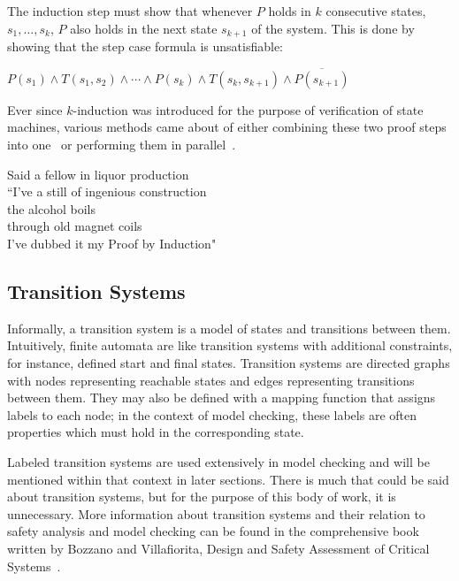 The induction step must show that whenever $P$ holds in $k$ consecutive states, $s_1, \ldots, s_k$, $P$ also holds in the next state $s_{k+1}$ of the system. This is done by showing that the step case formula is unsatisfiable:

\begin{center}
$P(s_1) \land T(s_1, s_2) \land \cdots \land P(s_k) \land T(s_{k}, s_{k+1}) \land \overline{P(s_{k+1})}$
\end{center}

Ever since $k$-induction was introduced for the purpose of verification of state machines, various methods came about of either combining these two proof steps into one~\cite{donaldson2011software} or performing them in parallel~\cite{kahsai2011pkind}. 

\noindent Said a fellow in liquor production\\
``I’ve a still of ingenious construction\\
the alcohol boils\\
through old magnet coils\\
I’ve dubbed it my Proof by Induction"
\newpage
\subsection{Transition Systems}
Informally, a transition system is a model of states and transitions between them. Intuitively, finite automata are like transition systems with additional constraints, for instance, defined start and final states. Transition systems are directed graphs with nodes representing reachable states and edges representing transitions between them. They may also be defined with a mapping function that assigns labels to each node; in the context of model checking, these labels are often properties which must hold in the corresponding state.

Labeled transition systems are used extensively in model checking and will be mentioned within that context in later sections. There is much that could be said about transition systems, but for the purpose of this body of work, it is unnecessary. More information about transition systems and their relation to safety analysis and model checking can be found in the comprehensive book written by Bozzano and Villafiorita, Design and Safety Assessment of Critical Systems~\cite{Bozzano:2010:DSA:1951720}.

